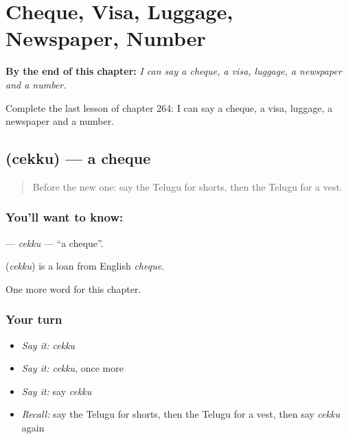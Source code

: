 
\chapter{Cheque, Visa, Luggage, Newspaper, Number}
\label{ch:te-cheque-visa-luggage-newspaper-number}

\begin{chapteropening}
\textbf{By the end of this chapter:} \emph{I can say a cheque, a visa, luggage, a newspaper and a number.}

Complete the last lesson of chapter 264: I can say a cheque, a visa, luggage, a newspaper and a number.
\end{chapteropening}

\section[\texorpdfstring{\te{చెక్కు} (cekku)}{చెక్కు (cekku)}]{ (cekku) — a cheque}

\label{lesson:TE-C264-cekku}



\begin{quote}
Before the new one: say the Telugu for shorts, then the Telugu for a vest.
\end{quote}

\subsection*{You'll want to know: }
\textbf{} — \emph{cekku} — \textquotedblleft{}a cheque\textquotedblright{}.

\begin{cousinweb}
\textbf{} (\emph{cekku}) is a loan from English \emph{cheque}.
\end{cousinweb}

\begin{grammarlens}[title={What you've built}]
One more word for this chapter.
\end{grammarlens}

\subsection*{Your turn}
\begin{itemize}
\raggedright
  \item \emph{Say it:} \emph{cekku}
  \item \emph{Say it:} \emph{cekku}, once more
  \item \emph{Say it:} say \emph{cekku}
  \item \emph{Recall:} say the Telugu for shorts, then the Telugu for a vest, then say \emph{cekku} again
\end{itemize}

